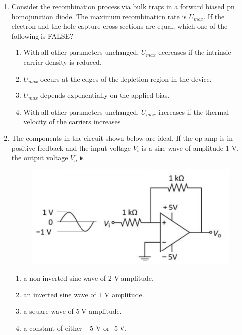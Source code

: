 \documentclass[a4paper, 11pt]{article}
\begin{document}
\begin{enumerate}
    \item Consider the recombination process via bulk traps in a forward biased pn homojunction diode. The maximum recombination rate is $U_{max}$. If the electron and the hole capture cross-sections are equal, which one of the following is FALSE?
    \begin{enumerate}
        \item With all other parameters unchanged, $U_{max}$ decreases if the intrinsic carrier density is reduced.
        \item $U_{max}$ occurs at the edges of the depletion region in the device.
        \item $U_{max}$ depends exponentially on the applied bias.
        \item With all other parameters unchanged, $U_{max}$ increases if the thermal velocity of the carriers increases.
    \end{enumerate}

    \hfill{}

    \item The components in the circuit shown below are ideal. If the op-amp is in positive feedback and the input voltage $V_i$ is a sine wave of amplitude 1 V, the output voltage $V_o$ is
    \begin{figure}[H]
        \centering
        \includegraphics[width=0.6\columnwidth]{figs/Q8.png}
        \caption*{}
        \label{fig:q18}
    \end{figure}
    \begin{enumerate}
        \item a non-inverted sine wave of 2 V amplitude.
        \item an inverted sine wave of 1 V amplitude.
        \item a square wave of 5 V amplitude.
        \item a constant of either +5 V or -5 V.
    \end{enumerate}

    \hfill{}
    

\end{enumerate}
\end{document}
